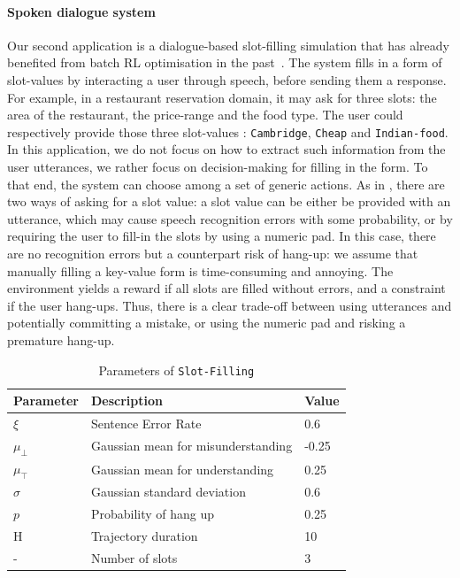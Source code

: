\paragraph{Spoken dialogue system}
Our second application is a dialogue-based slot-filling simulation that has already benefited from batch RL optimisation in the past~\citep{Li2009ReinforcementLF,chandramohan2010optimizing,pietquin2011sample}. The system fills in a form of slot-values by interacting a user through speech, before sending them a response. For example, in a restaurant reservation domain, it may ask for three slots: the area of the restaurant, the price-range and the food type. The user could respectively provide those three slot-values : \texttt{Cambridge}, \texttt{Cheap} and \texttt{Indian-food}. In this application, we do not focus on how to extract such information from the user utterances, we rather focus on decision-making for filling in the form. To that end, the system can choose among a set of generic actions. As in \citep{carrara2018safe}, there are two ways of asking for a slot value: a slot value can be either be provided with an utterance, which may cause speech recognition errors with some probability, or by requiring the user to fill-in the slots by using a numeric pad. In this case, there are no recognition errors but a counterpart risk of hang-up: we assume that manually filling a key-value form is time-consuming and annoying. The environment yields a reward if all slots are filled without errors, and a constraint if the user hang-ups. Thus, there is a clear trade-off between using utterances and potentially committing a mistake, or using the numeric pad and risking a premature hang-up.

\begin{table}[ht!]
    \centering
    \begin{tabular}{lll}
        \toprule
        Parameter & Description & Value\tabularnewline
        \midrule
        $\xi$ & Sentence Error Rate & 0.6\tabularnewline
        $\mu_{\bot}$& Gaussian mean for misunderstanding & -0.25\tabularnewline
        $\mu_{\top}$& Gaussian mean for understanding & 0.25\tabularnewline
        $\sigma$& Gaussian standard deviation & 0.6\tabularnewline
        $p$& Probability of hang up & 0.25\tabularnewline
        H & Trajectory duration & 10\tabularnewline
        - & Number of slots & 3\tabularnewline
        \bottomrule
    \end{tabular}
    \caption{Parameters of \texttt{Slot-Filling}}
    \label{tab:param-slot-filling}
\end{table}

